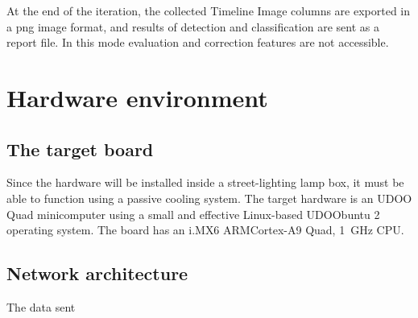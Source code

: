 At the end of the iteration, the collected Timeline Image columns are exported in a png image format, and results of detection and classification are sent as a report file.
In this mode evaluation and correction features are not accessible.
\section{Hardware environment}
\subsection{The target board}
Since the hardware will be installed inside a street-lighting lamp box, it must be able to function using a passive cooling system.
The target hardware is an UDOO Quad minicomputer using a small and effective Linux-based UDOObuntu 2 operating system.
The board has an i.MX6 ARM\reg Cortex\reg-A9 Quad, \SI{1}{GHz} CPU.

\subsection{Network architecture}
The data sent



